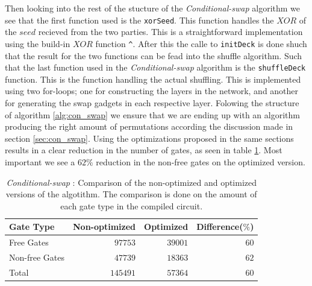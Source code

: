 \documentclass[twoside,11pt,openright]{report}
\newcommand{\CS}{\textit{Conditional-swap} }
\begin{document}
\bigskip

Then looking into the rest of the stucture of the \CS algorithm we see that the first function used is the \verb|xorSeed|. This function handles the $XOR$ of the $seed$ recieved from the two parties. This is a straightforward implementation using the build-in $XOR$ function \verb|^|. After this the calle to \verb|initDeck| is done shuch that the result for the two functions can be fead into the shuffle algorithm. Such that the last function used in the \CS algorithm is the \verb|shuffleDeck| function. This is the function handling the actual shuffling. This is implemented using two for-loops; one for constructing the layers in the network, and another for generating the swap gadgets in each respective layer. Folowing the structure of algorithm \ref{alg:con_swap} we ensure that we are ending up with an algorithm producing the right amount of permutations according the discussion made in section \ref{sec:con_swap}. Using the optimizations proposed in the same sections results in a clear reduction in the number of gates, as seen in table \ref{table:con_swap_comp}. Most important we see a $62\%$ reduction in the non-free gates on the optimized version.

\begin{table}
\centering
\begin{tabular}{l || r r r}
Gate Type      & Non-optimized  & Optimized & Difference($\%$)    \\
\hline
Free Gates     &  $97753$       & $39001$   & $60$ \\
Non-free Gates &  $47739$       & $18363$   & $62$ \\
\hline
Total          & $145491$       & $57364$   & $60$
\end{tabular}
\caption{\CS: Comparison of the non-optimized and optimized versions of the algotithm. The comparison is done on the amount of each gate type in the compiled circuit.}
\label{table:con_swap_comp}
\end{table}

\bigskip
\end{document}
